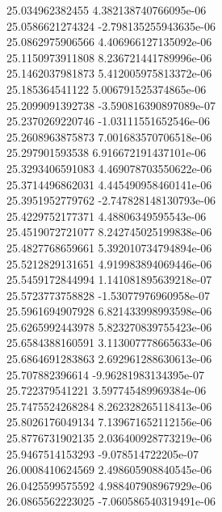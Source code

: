 {25.034962382455 4.382138740766095e-06 \\
25.0586621274324 -2.798135255943635e-06 \\
25.0862975906566 4.406966127135092e-06 \\
25.1150973911808 8.236721441789996e-06 \\
25.1462037981873 5.412005975813372e-06 \\
25.185364541122 5.006791525374865e-06 \\
25.2099091392738 -3.590816390897089e-07 \\
25.2370269220746 -1.03111551652546e-06 \\
25.2608963875873 7.001683570706518e-06 \\
25.297901593538 6.916672191437101e-06 \\
25.3293406591083 4.469078703550622e-06 \\
25.3714496862031 4.445490958460141e-06 \\
25.3951952779762 -2.747828148130793e-06 \\
25.4229752177371 4.48806349595543e-06 \\
25.4519072721077 8.242745025199838e-06 \\
25.4827768659661 5.392010734794894e-06 \\
25.5212829131651 4.919983894069446e-06 \\
25.5459172844994 1.141081895639218e-07 \\
25.5723773758828 -1.53077976960958e-07 \\
25.5961694907928 6.821433998993598e-06 \\
25.6265992443978 5.823270839755423e-06 \\
25.6584388160591 3.113007778665633e-06 \\
25.6864691283863 2.692961288630613e-06 \\
25.707882396614 -9.96281983134395e-07 \\
25.722379541221 3.597745489969384e-06 \\
25.7475524268284 8.262328265118413e-06 \\
25.8026176049134 7.139671652112156e-06 \\
25.8776731902135 2.036400928773219e-06 \\
25.9467514153293 -9.078514722205e-07 \\
26.0008410624569 2.498605908840545e-06 \\
26.0425599575592 4.988407908967929e-06 \\
26.0865562223025 -7.060586540319491e-06 \\
}
